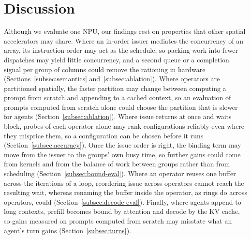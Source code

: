 \section{Discussion}
\label{sec:discussion}

Although we evaluate one NPU, our findings rest on properties that other spatial accelerators may share.
Where an in-order issuer mediates the concurrency of an array, its instruction order may act as the schedule, so packing work into fewer dispatches may yield little concurrency, and a second queue or a completion signal per group of columns could remove the rationing in hardware (Sections~\ref{subsec:semantics} and~\ref{subsec:ablation}).
Where operators are partitioned spatially, the faster partition may change between computing a prompt from scratch and appending to a cached context, so an evaluation of prompts computed from scratch alone could choose the partition that is slower for agents (Section~\ref{subsec:ablation}).
Where issue returns at once and waits block, probes of each operator alone may rank configurations reliably even where they misprice them, so a configuration can be chosen before it runs (Section~\ref{subsec:accuracy}).
Once the issue order is right, the binding term may move from the issuer to the groups' own busy time, so further gains could come from kernels and from the balance of work between groups rather than from scheduling (Section~\ref{subsec:bound-eval}).
Where an operator reuses one buffer across the iterations of a loop, reordering issue across operators cannot reach the resulting wait, whereas renaming the buffer inside the operator, as rings do across operators, could (Section~\ref{subsec:decode-eval}).
Finally, where agents append to long contexts, prefill becomes bound by attention and decode by the KV cache, so gains measured on prompts computed from scratch may misstate what an agent's turn gains (Section~\ref{subsec:turns}).
